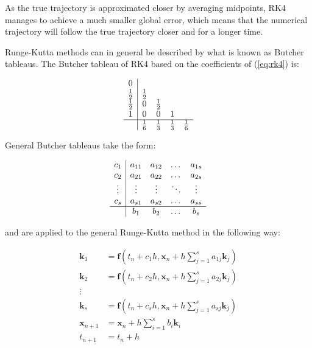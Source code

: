 \documentclass[12pt,a4paper]{book}
\begin{document}
As the true trajectory is approximated closer by averaging midpoints, RK4 manages to achieve a much smaller global error, which means that the numerical trajectory will follow the true trajectory closer and for a longer time.

Runge-Kutta methods can in general be described by what is known as Butcher tableaus. The Butcher tableau of RK4 based on the coefficients of (\ref{eq:rk4}) is:

\renewcommand\arraystretch{1.2}
\begin{equation}
    \begin{array}
    {c|cccc}
    0\\
    \frac{1}{2} & \frac{1}{2}\\
    \frac{1}{2} &0 &\frac{1}{2} \\
    1& 0& 0& 1\\
    \hline
    & \frac{1}{6} &\frac{1}{3} &\frac{1}{3} &\frac{1}{6} 
    \end{array}
    \label{eq:rk4_butcher}
\end{equation}

General Butcher tableaus take the form:

\begin{equation}
    \begin{array}
    {c|cccc}
    c_1 & a_{11} & a_{12} & \dots & a_{1s} \\
    c_2 & a_{21} & a_{22} & \dots & a_{2s} \\
    \vdots & \vdots & \vdots & \ddots & \vdots \\
    c_s & a_{s1} & a_{s2} & \dots & a_{ss} \\
    \hline
    & b_1 & b_2 & \dots & b_s
    \end{array}
    \label{eq:butcher}
\end{equation}

and are applied to the general Runge-Kutta method in the following way:

\begin{equation}
    \begin{split}
        \bm{k}_1 &= \bm{f}(t_n + c_1 h, \bm{x}_n + h \sum_{j=1}^{s} a_{1j} \bm{k}_j) \\
        \bm{k}_2 &= \bm{f}(t_n + c_2 h, \bm{x}_n + h \sum_{j=1}^{s} a_{2j} \bm{k}_j) \\
        \vdots \\
        \bm{k}_s &= \bm{f}(t_n + c_s h, \bm{x}_n + h \sum_{j=1}^{s} a_{sj} \bm{k}_j) \\
        \bm{x}_{n+1} &= \bm{x}_n + h \sum_{i=1}^{s} b_i \bm{k}_i \\
        t_{n+1} &= t_n + h
    \end{split}
\end{equation}
\end{document}
